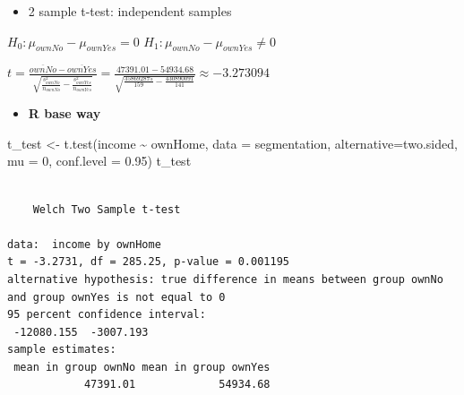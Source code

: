 \documentclass[
  ignorenonframetext,
]{beamer}
\newenvironment{Shaded}{\begin{snugshade}}{\end{snugshade}}
\newcommand{\AttributeTok}[1]{\textcolor[rgb]{0.40,0.45,0.13}{#1}}
\newcommand{\DecValTok}[1]{\textcolor[rgb]{0.68,0.00,0.00}{#1}}
\newcommand{\FloatTok}[1]{\textcolor[rgb]{0.68,0.00,0.00}{#1}}
\newcommand{\FunctionTok}[1]{\textcolor[rgb]{0.28,0.35,0.67}{#1}}
\newcommand{\NormalTok}[1]{\textcolor[rgb]{0.00,0.23,0.31}{#1}}
\newcommand{\OtherTok}[1]{\textcolor[rgb]{0.00,0.23,0.31}{#1}}
\newcommand{\SpecialCharTok}[1]{\textcolor[rgb]{0.37,0.37,0.37}{#1}}
\newcommand{\StringTok}[1]{\textcolor[rgb]{0.13,0.47,0.30}{#1}}
\providecommand{\tightlist}{%
  \setlength{\itemsep}{0pt}\setlength{\parskip}{0pt}}\usepackage{longtable,booktabs,array}
\begin{document}
\begin{frame}[fragile]{}
\label{section-16}
\begin{itemize}
\tightlist
\item
  2 sample t-test: independent samples
\end{itemize}

\(H_0: \mu_{ownNo} - \mu_{ownYes}= 0\)
\(H_1: \mu_{ownNo} - \mu_{ownYes} \neq 0\)

\(t = \frac{\overline{ownNo} - \overline{ownYes}}{\sqrt{\frac{s_{ownNo}^2}{n_{ownNo}} - \frac{s_{ownYes}^2}{n_{ownYes}}}} = \frac{47391.01 - 54934.68}{\sqrt{ \frac{358692875}{159} - \frac{430890091}{141}}} \approx -3.273094\)

\begin{itemize}
\tightlist
\item
  \textbf{R base way}
\end{itemize}

\tiny

\begin{Shaded}
\begin{Highlighting}[]
\NormalTok{t\_test }\OtherTok{\textless{}{-}} \FunctionTok{t.test}\NormalTok{(income }\SpecialCharTok{\textasciitilde{}}\NormalTok{ ownHome, }\AttributeTok{data =}\NormalTok{ segmentation,}
                 \AttributeTok{alternative=}\StringTok{\textquotesingle{}two.sided\textquotesingle{}}\NormalTok{, }\AttributeTok{mu =} \DecValTok{0}\NormalTok{,}
                 \AttributeTok{conf.level =} \FloatTok{0.95}\NormalTok{)}
\NormalTok{t\_test}
\end{Highlighting}
\end{Shaded}

\begin{verbatim}

    Welch Two Sample t-test

data:  income by ownHome
t = -3.2731, df = 285.25, p-value = 0.001195
alternative hypothesis: true difference in means between group ownNo and group ownYes is not equal to 0
95 percent confidence interval:
 -12080.155  -3007.193
sample estimates:
 mean in group ownNo mean in group ownYes 
            47391.01             54934.68 
\end{verbatim}
\end{frame}
\end{document}
